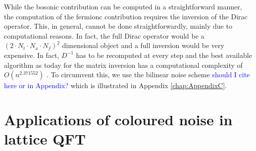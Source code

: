 While the bosonic contribution can be computed in a straightforward manner, the computation of the fermionc contribution requires the inversion of the Dirac operator. This, in general, cannot be done straightforwardly, mainly due to computational reasons.
In fact, the full Dirac operator would be a $(2 \cdot N_t \cdot N_x \cdot N_f)^2$ dimensional object and a full inversion would be very expensive. In fact, $D^{-1}$ has to be recomputed at every step and the best available algorithm as today for the matrix inversion has a computational complexity of $O(n^{2.371552})$ \cite{williams2023new}. To circumvent this, we use the bilinear noise scheme \cite{bilinearnoise1,bilinearnoise2} \textcolor{blue}{should I cite here or in Appendix?} which is illustrated in Appendix \ref{chap:AppendixC}.




\section{Applications of coloured noise in lattice QFT}
\label{sec:lattice_with_coloured_noise}

